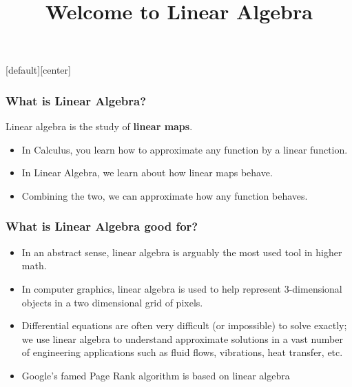
[default][center]

\title{Welcome to Linear Algebra}
\author{\prof}

\date{}




\begin{frame}
\titlepage
\end{frame}

\begin{frame} \frametitle{What is Linear Algebra? }
Linear algebra is the study of {\bf linear maps}.
\begin{itemize}
\item In Calculus, you learn how to approximate any function by a linear function.
\item In Linear Algebra, we learn about how linear maps behave.
\item Combining the two, we can approximate how any function behaves.
\end{itemize}
\end{frame}

\begin{frame} \frametitle{What is Linear Algebra good for?}
\begin{itemize}
\item In an abstract sense, linear algebra is arguably the most used tool in higher math.
\item In computer graphics, linear algebra is used to help represent 3-dimensional objects in a two dimensional grid of pixels.
\item Differential equations are often very difficult (or impossible) to solve exactly; we use linear algebra to understand approximate solutions in a vast number of engineering applications such as fluid flows, vibrations, heat transfer, etc.
\item Google's famed Page Rank algorithm is based on linear algebra
\end{itemize}
\end{frame}

